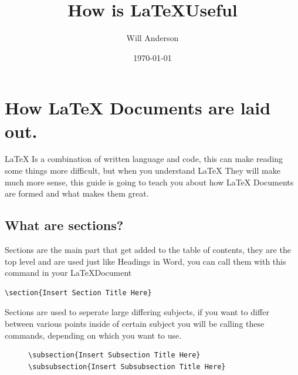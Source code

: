 \documentclass[12pt, letterpaper, oneside]{article} \usepackage[utf8]{inputenc}
\title{How is \LaTeX Useful}
\author{Will Anderson}
\date{\today}
\begin{document}
\maketitle

\newpage

\tableofcontents

\listoffigures

\newpage

\section{How \LaTeX{} Documents are laid out.}

\LaTeX{} Is a combination of written language and code, this can make reading some things more difficult, but when you understand \LaTeX{} They will make much more sense, this guide is going to teach you about how \LaTeX{} Documents are formed and what makes them great.

\subsection{What are sections?}

Sections are the main part that get added to the table of contents, they are the top level and are used just like Headings in Word, you can call them with this command in your \LaTeX Document
\begin{lstlisting}
\section{Insert Section Title Here}
\end{lstlisting}

Sections are used to seperate large differing subjects, if you want to differ between various points inside of certain subject you will be calling these commands, depending on which you want to use. 

\begin{figure}[H]
\begin{lstlisting}
\subsection{Insert Subsection Title Here}
\subsubsection{Insert Subsubsection Title Here}
\end{lstlisting}
\end{figure}
\end{document}
